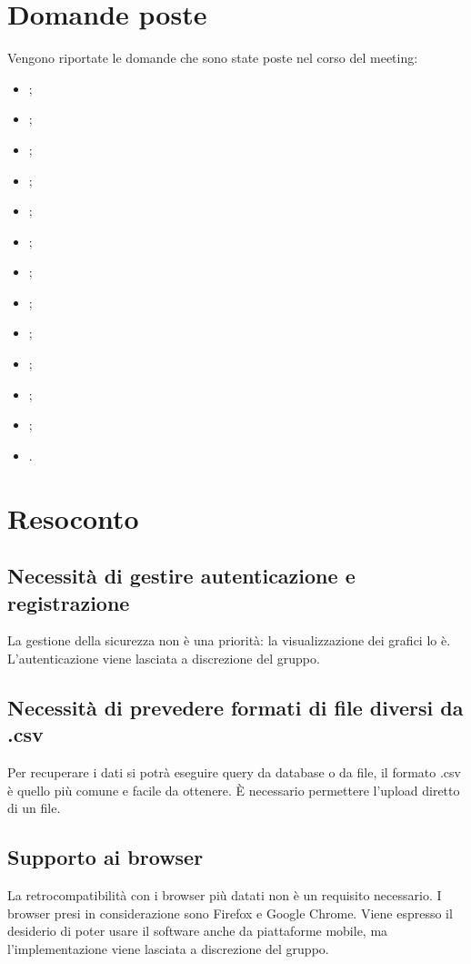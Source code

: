 \documentclass{article}
\begin{document}
\section{Domande poste}
\label{sec:domande_poste}
	Vengono riportate le domande che sono state poste nel corso del meeting:
	\begin{itemize}
		\item {};
		\item {};
		\item {};
		\item {};
		\item {};
		\item {};
		\item {};
		\item {};
		\item {};
		\item {};
		\item {};
		\item {};
        \item {}.
    	\end{itemize}

\section{Resoconto}
\label{sec:resoconto}

	\subsection{Necessità di gestire autenticazione e registrazione}
	\label{sub:domanda_01}
    La gestione della sicurezza non è una priorità: la visualizzazione dei grafici lo è. L'autenticazione viene lasciata a discrezione del gruppo.

    \subsection{Necessità di prevedere formati di file diversi da .csv}
	\label{sub:domanda_02}
	Per recuperare i dati si potrà eseguire query da database o da file, il formato .csv è quello più comune e facile da ottenere. È necessario permettere l'upload diretto di un file.

    \subsection{Supporto ai browser}
    \label{sub:domanda_03}
    La retrocompatibilità con i browser più datati non è un requisito necessario. I browser presi in considerazione sono Firefox e Google Chrome. Viene espresso il desiderio di poter usare il software anche da piattaforme mobile, ma l'implementazione viene lasciata a discrezione del gruppo.
\end{document}
